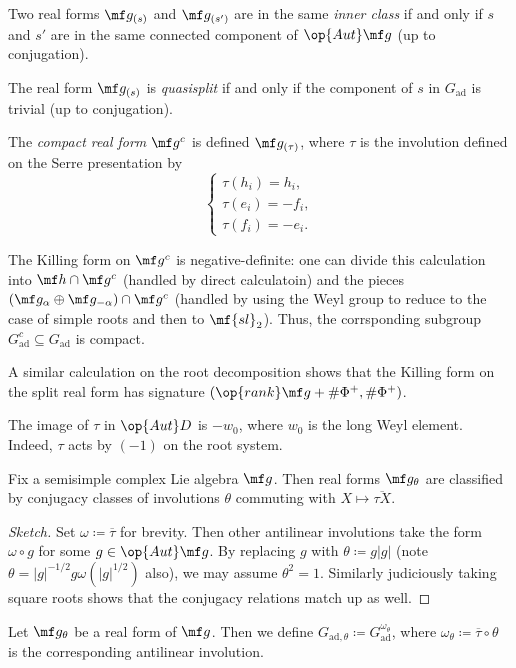 \documentclass{article}
\begin{document}
\begin{definition}
	Two real forms $\mf g_{(s)}$ and $\mf g_{(s')}$ are in the same \textit{inner class} if and only if $s$ and $s'$ are in the same connected component of $\op{Aut}\mf g$ (up to conjugation).
\end{definition}
\begin{definition}[quasisplit]
	The real form $\mf g_{(s)}$ is \textit{quasisplit} if and only if the component of $s$ in $G_{\mathrm{ad}}$ is trivial (up to conjugation).
\end{definition}
\begin{definition}
	The \textit{compact real form} $\mf g^c$ is defined $\mf g_{(\tau)}$, where $\tau$ is the involution defined on the Serre presentation by
	\[\begin{cases}
		\tau(h_i)=h_i, \\
		\tau(e_i)=-f_i, \\
		\tau(f_i)=-e_i.
	\end{cases}\]
\end{definition}
\begin{remark}
	The Killing form on $\mf g^c$ is negative-definite: one can divide this calculation into $\mf h\cap\mf g^c$ (handled by direct calculatoin) and the pieces $(\mf g_\alpha\oplus\mf g_{-\alpha})\cap\mf g^c$ (handled by using the Weyl group to reduce to the case of simple roots and then to $\mf{sl}_2$). Thus, the corrsponding subgroup $G_{\mathrm{ad}}^c\subseteq G_{\mathrm{ad}}$ is compact.
\end{remark}
\begin{remark}
	A similar calculation on the root decomposition shows that the Killing form on the split real form has signature $(\op{rank}\mf g+\#\Phi^+,\#\Phi^+)$.
\end{remark}
\begin{remark}
	The image of $\tau$ in $\op{Aut}D$ is $-w_0$, where $w_0$ is the long Weyl element. Indeed, $\tau$ acts by $(-1)$ on the root system.
\end{remark}
\begin{proposition}
	Fix a semisimple complex Lie algebra $\mf g$. Then real forms $\mf g_\theta$ are classified by conjugacy classes of involutions $\theta$ commuting with $X\mapsto\overline{\tau X}$.
\end{proposition}
\begin{proof}[Sketch]
	Set $\omega\coloneqq\overline\tau$ for brevity. Then other antilinear involutions take the form $\omega\circ g$ for some $g\in\op{Aut}\mf g$. By replacing $g$ with $\theta\coloneqq g\left|g\right|$ (note $\theta=\left|g\right|^{-1/2}g\omega\left(\left|g\right|^{1/2}\right)$ also), we may assume $\theta^2=1$. Similarly judiciously taking square roots shows that the conjugacy relations match up as well.
\end{proof}
\begin{definition}
	Let $\mf g_\theta$ be a real form of $\mf g$. Then we define $G_{\mathrm{ad},\theta}\coloneqq G_{\mathrm{ad}}^{\omega_\theta}$, where $\omega_\theta\coloneqq\overline\tau\circ\theta$ is the corresponding antilinear involution.
\end{definition}
\end{document}
